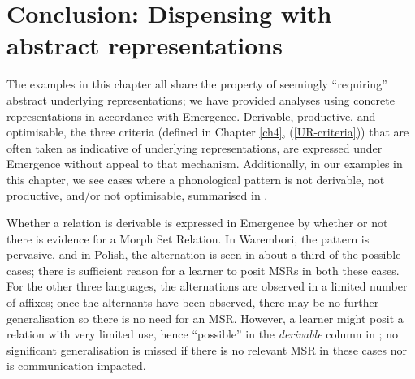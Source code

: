 \section{Conclusion: Dispensing with abstract representations}

The examples in this chapter all share the property of seemingly ``requiring'' abstract underlying representations; we have provided analyses using concrete representations in accordance with Emergence. Derivable, productive, and optimisable, the three criteria (defined in Chapter \ref{ch4}, (\ref{UR-criteria})) that are often taken as indicative of underlying representations, are expressed under Emergence without appeal to that mechanism. Additionally, in our examples in this chapter, we see cases where a phonological pattern is not derivable, not productive, and/or not optimisable, summarised in .

\begin{table} 
\caption{Summary of  examples\label{chapter_summary}} 
\end{table}


Whether a relation is derivable is expressed in Emergence by whether or not there is evidence for a Morph Set Relation. In Warembori, the pattern is pervasive, and in Polish, the alternation is seen in about a third of the possible cases; there is sufficient reason for a learner to posit MSRs in both these cases. For the other three languages, the alternations are observed in a limited number of affixes; once the alternants have been observed, there may be no further generalisation so there is no need for an MSR. However, a learner might posit a relation with very limited use, hence ``possible'' in the \textit{derivable} column in ; no significant generalisation is missed if there is no relevant MSR in these cases nor is communication impacted. 

